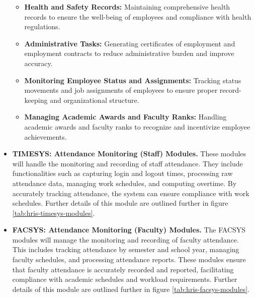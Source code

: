 \begin{itemize}
\begin{itemize}
            \item[] \textbf{Health and Safety Records: } Maintaining comprehensive health records to ensure the well-being of employees and compliance with health regulations.
            
            \item[] \textbf{Administrative Tasks: } Generating certificates of employment and employment contracts to reduce administrative burden and improve accuracy.
            
            \item[] \textbf{Monitoring Employee Status and Assignments:  } Tracking status movements and job assignments of employees to ensure proper record-keeping and organizational structure.
            
            \item[] \textbf{Managing Academic Awards and Faculty Ranks: } Handling academic awards and faculty ranks to recognize and incentivize employee achievements.
        \end{itemize}
       

        \item[] \textbf{TIMESYS: Attendance Monitoring (Staff) Modules.} These modules will handle the monitoring and recording of staff attendance. They include functionalities such as capturing login and logout times, processing raw attendance data, managing work schedules, and computing overtime. By accurately tracking attendance, the system can ensure compliance with work schedules. Further details of this module are outlined further in figure \ref*{tab:hris-timesys-modules}.

        \item[] \textbf{FACSYS: Attendance Monitoring (Faculty) Modules.} The FACSYS modules will manage the monitoring and recording of faculty attendance. This includes tracking attendance by semester and school year, managing faculty schedules, and processing attendance reports. These modules ensure that faculty attendance is accurately recorded and reported, facilitating compliance with academic schedules and workload requirements. Further details of this module are outlined further in figure \ref*{tab:hris-facsys-modules}.


\end{itemize}
